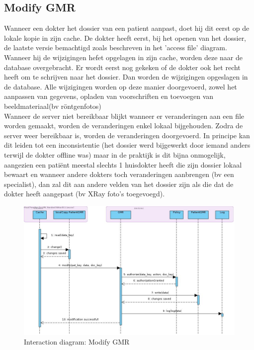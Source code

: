 \documentclass[a4paper,10pt]{article}
\begin{document}
\subsection{Modify GMR}
Wanneer een dokter het dossier van een patient aanpast, doet hij dit eerst op de lokale kopie in zijn cache. De dokter heeft eerst, bij het openen van het dossier, de laatste versie bemachtigd zoals beschreven in het 'access file' diagram. Wanneer hij de wijzigingen hefet opgelagen in zijn cache, worden deze naar de database overgebracht. Er wordt eerst nog gekeken of de dokter ook het recht heeft om te schrijven naar het dossier. Dan worden de wijzigingen opgeslagen in de database. Alle wijzigingen worden op deze manier doorgevoerd, zowel het aanpassen van gegevens, opladen van voorschriften en toevoegen van beeldmateriaal(bv röntgenfotos)\\
Wanneer de server niet bereikbaar blijkt wanneer er veranderingen aan een file worden gemaakt, worden de veranderingen enkel lokaal bijgehouden. Zodra de server weer bereikbaar is, worden de veranderingen doorgevoerd. In principe kan dit leiden tot een inconsistentie (het dossier werd bijgewerkt door iemand anders terwijl de dokter offline was) maar in de praktijk is dit bijna onmogelijk, aangezien een patiënt meestal slechts 1 huisdokter heeft die zijn dossier lokaal bewaart en wanneer andere dokters toch veranderingen aanbrengen (bv een specialist), dan zal dit aan andere velden van het dossier zijn als die dat de dokter heeft aangepast (bv XRay foto's toegevoegd). 

\begin{figure}[!h]
  \includegraphics[width=\textwidth]{../images/modifyGMR.jpg}
  \caption{Interaction diagram: Modify GMR}
\end{figure}
\end{document}
